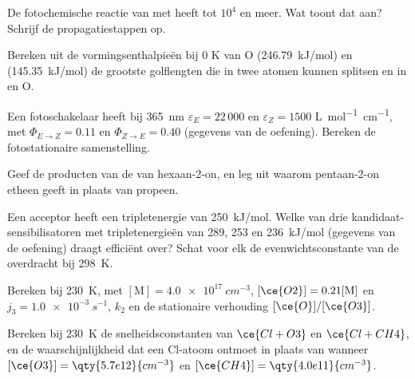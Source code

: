 \begin{exercise}[$\star$]\label{exo:b3:photochemistry:3}
De fotochemische reactie van  met  heeft 
tot $10^4$ en meer. Wat toont dat aan? Schrijf de propagatiestappen op.
\end{exercise}

\begin{exercise}[$\star$]\label{exo:b3:photochemistry:4}
Bereken uit de vormingsenthalpieën bij 0 K van O (\qty{246.79}{kJ/mol}) en
 (\qty{145.35}{kJ/mol}) de grootste golflengten die  in twee
atomen kunnen splitsen en  in  en O.
\end{exercise}

\begin{exercise}[$\star\star$]\label{exo:b3:photochemistry:5}
Een fotoschakelaar heeft bij \qty{365}{nm} $\varepsilon_E = 22\,000$ en $\varepsilon_Z = 1500$ \unit{L.mol^{-1}.cm^{-1}}, met
$\Phi_{E\to Z} = 0.11$ en $\Phi_{Z\to E} = 0.40$ (gegevens van de oefening).
Bereken de fotostationaire samenstelling.
\end{exercise}

\begin{exercise}[$\star\star$]\label{exo:b3:photochemistry:6}
Geef de producten van de  van hexaan-2-on, en
leg uit waarom pentaan-2-on etheen geeft in plaats van propeen.
\end{exercise}

\begin{exercise}[$\star\star$]\label{exo:b3:photochemistry:7}
Een acceptor heeft een tripletenergie van \qty{250}{kJ/mol}. Welke van drie
kandidaat-sensibilisatoren met tripletenergieën van 289, 253 en
\qty{236}{kJ/mol} (gegevens van de oefening) draagt efficiënt over? Schat
voor elk de evenwichtsconstante van de overdracht bij \qty{298}{K}.
\end{exercise}

\begin{exercise}[$\star\star$]\label{exo:b3:photochemistry:8}
Bereken bij \qty{230}{K}, met $[\mathrm M] = \qty{4.0e17}{cm^{-3}}$, $[\ce{O2}] = 0.21[\mathrm M]$ en $j_3 = \qty{1.0e-3}{s^{-1}}$,
$k_2$ en de stationaire verhouding $[\ce{O}]/[\ce{O3}]$.
\end{exercise}

\begin{exercise}[$\star\star$]\label{exo:b3:photochemistry:9}
Bereken bij \qty{230}{K} de snelheidsconstanten van $\ce{Cl + O3}$ en $\ce{Cl + CH4}$, en de
waarschijnlijkheid dat een Cl-atoom  ontmoet in plaats van 
wanneer $[\ce{O3}] = \qty{5.7e12}{cm^{-3}}$
en $[\ce{CH4}] = \qty{4.0e11}{cm^{-3}}$.
\end{exercise}

